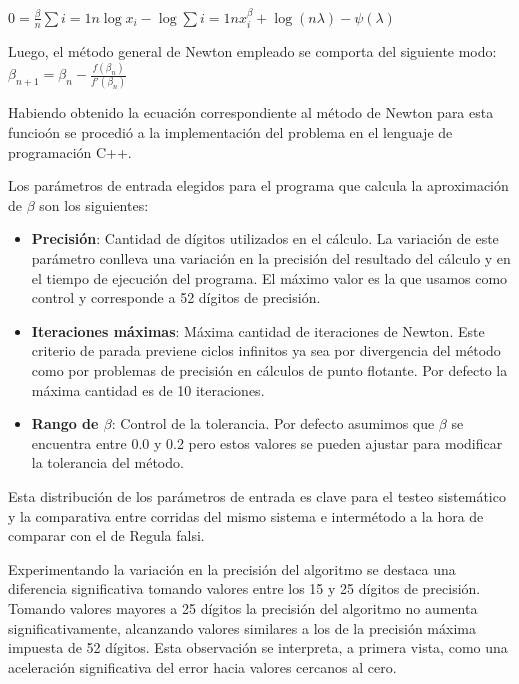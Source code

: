 $0 = \frac{\beta}{n}\sum{i=1}{n}\log x_i - \log \sum{i=1}{n}x_i^{\beta} + \log(n\lambda)-\psi(\lambda)$

Luego, el m\'etodo general de Newton empleado se comporta del siguiente modo: \\

$\beta_{n+1} = \beta_{n} - \frac{f(\beta_{n})}{f'(\beta_{n})}$

Habiendo obtenido la ecuaci\'on correspondiente al m\'etodo de Newton para esta funcio\'on se procedi\'o a la 
implementaci\'on del problema en el lenguaje de programaci\'on C++.

Los par\'ametros de entrada elegidos para el programa que calcula la aproximaci\'on de $\beta$ son los siguientes:

\begin{itemize}
  \item \textbf{Precisi\'on}: Cantidad de d\'igitos utilizados en el c\'alculo. La variaci\'on de este par\'ametro 
conlleva una variaci\'on en la precisi\'on del resultado del c\'alculo y en el tiempo de ejecuci\'on del programa. El 
m\'aximo valor es la que usamos como control y corresponde a 52 d\'igitos de precisi\'on.

  \item \textbf{Iteraciones m\'aximas}: M\'axima cantidad de iteraciones de Newton. Este criterio de parada previene 
ciclos infinitos ya sea por divergencia del m\'etodo como por problemas de precisi\'on en c\'alculos de punto flotante. 
Por defecto la m\'axima cantidad es de 10 iteraciones.

  \item \textbf{Rango de $\beta$}: Control de la tolerancia. Por defecto asumimos que $\beta$ se encuentra entre 0.0 y 
0.2 pero estos valores se pueden ajustar para modificar la tolerancia del m\'etodo.
\end{itemize}

Esta distribuci\'on de los par\'ametros de entrada es clave para el testeo sistem\'atico y la comparativa entre 
corridas del mismo sistema e interm\'etodo a la hora de comparar con el de Regula falsi.

Experimentando la variaci\'on en la precisi\'on del algoritmo se destaca una diferencia significativa tomando valores 
entre los 15 y 25 d\'igitos de precisi\'on. Tomando valores mayores a 25 d\'igitos la precisi\'on del algoritmo no 
aumenta significativamente, alcanzando valores similares a los de la precisi\'on m\'axima impuesta de 52 d\'igitos. 
Esta observaci\'on se interpreta, a primera vista, como una aceleraci\'on significativa del error hacia valores 
  cercanos al cero.

